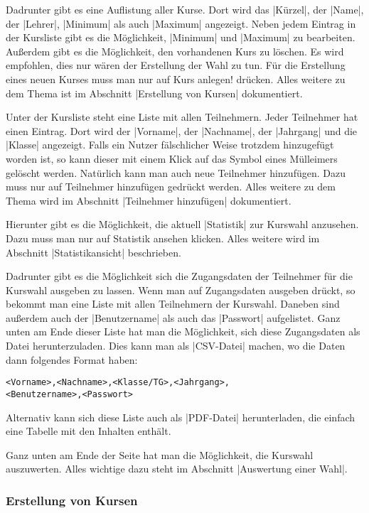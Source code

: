 \documentclass[ngerman]{ltxdoc}
\begin{document}
Dadrunter gibt es eine Auflistung aller Kurse. Dort wird das |Kürzel|, der |Name|,
der |Lehrer|, |Minimum| als auch |Maximum| angezeigt. Neben jedem Eintrag in der
Kursliste gibt es die Möglichkeit, |Minimum| und |Maximum| zu bearbeiten. Außerdem
gibt es die Möglichkeit, den vorhandenen Kurs zu löschen. Es wird empfohlen, dies
nur wären der Erstellung der Wahl zu tun. Für die Erstellung eines neuen Kurses
muss man nur auf \glqq Kurs anlegen!\grqq{} drücken. Alles weitere zu dem Thema ist
im Abschnitt |Erstellung von Kursen| dokumentiert.

Unter der Kursliste steht eine Liste mit allen Teilnehmern. Jeder Teilnehmer
hat einen Eintrag. Dort wird der |Vorname|, der |Nachname|, der |Jahrgang|
und die |Klasse| angezeigt. Falls ein Nutzer fälschlicher Weise trotzdem hinzugefügt
worden ist, so kann dieser mit einem Klick auf das Symbol eines Mülleimers gelöscht
werden. Natürlich kann man auch neue Teilnehmer hinzufügen. Dazu muss nur auf
\glqq Teilnehmer hinzufügen\grqq{} gedrückt werden. Alles weitere zu dem Thema wird
im Abschnitt |Teilnehmer hinzufügen| dokumentiert.

Hierunter gibt es die Möglichkeit, die aktuell |Statistik| zur Kurswahl anzusehen.
Dazu muss man nur auf \glqq Statistik ansehen\grqq{} klicken. Alles weitere wird im
Abschnitt |Statistikansicht| beschrieben.

Dadrunter gibt es die Möglichkeit sich die Zugangsdaten der Teilnehmer für die
Kurswahl ausgeben zu lassen. Wenn man auf \glqq Zugangsdaten ausgeben\grqq{} drückt,
so bekommt man eine Liste mit allen Teilnehmern der Kurswahl. Daneben sind außerdem
auch der |Benutzername| als auch das |Passwort| aufgelistet. Ganz unten am Ende
dieser Liste hat man die Möglichkeit, sich diese Zugangsdaten als Datei herunterzuladen.
Dies kann man als |CSV-Datei| machen, wo die Daten dann folgendes Format haben:

\begin{lstlisting}[style=tex]
<Vorname>,<Nachname>,<Klasse/TG>,<Jahrgang>,
<Benutzername>,<Passwort>
\end{lstlisting}

Alternativ kann sich diese Liste auch als |PDF-Datei| herunterladen, die einfach
eine Tabelle mit den Inhalten enthält.

Ganz unten am Ende der Seite hat man die Möglichkeit, die Kurswahl auszuwerten.
Alles wichtige dazu steht im Abschnitt |Auswertung einer Wahl|.

\subsubsection{Erstellung von Kursen}
\end{document}
